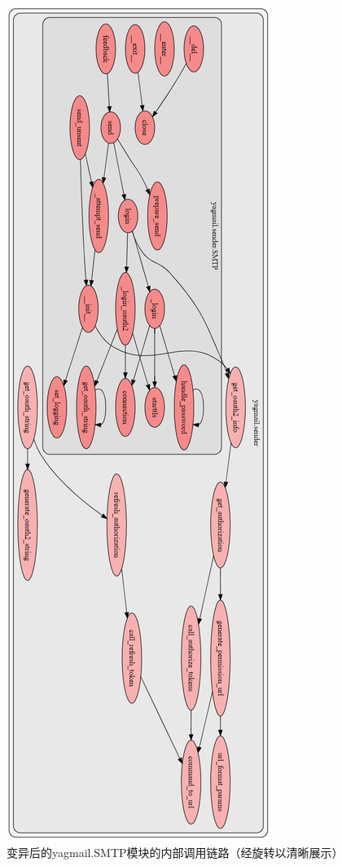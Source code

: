 \documentclass[UTF8,12pt,a4paper]{ctexart}
\begin{document}
    \begin{figure}[H]
        \centering
        \includegraphics[height=0.95\textheight]{figure/changed-function-graph-only-sender.png}
        \caption{变异后的yagmail.SMTP模块的内部调用链路（经旋转以清晰展示）}
        \label{fig:changed-callgraph}
    \end{figure}
\end{document}
